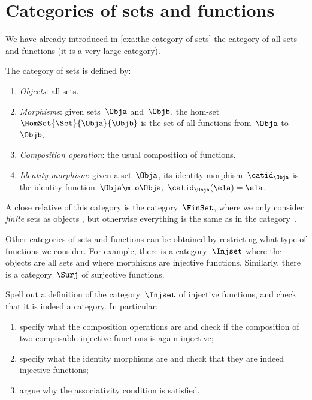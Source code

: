 
\section{Categories of sets and functions}

We have already introduced in \cref{exa:the-category-of-sets} the category of all sets and functions (it is a very large category).

\begin{ctdefinition}
    \label{def:Set}
    The category of sets \iindex{\Set} is defined by:
    \begin{enumerate}
        \item \emph{Objects}: all sets.
        \item \emph{Morphisms}: given sets~$\Obja$ and~$\Objb$, the hom-set~$\HomSet{\Set}{\Obja}{\Objb}$ is the set of all functions from~$\Obja$ to~$\Objb$.
        \item \emph{Composition operation}: the usual composition of functions.
        \item \emph{Identity morphism}: given a set~$\Obja$, its identity morphism~$\catid_\Obja$ is the identity function~$\Obja \mto \Obja, \ \catid_\Obja(\ela) = \ela$.
    \end{enumerate}
\end{ctdefinition}

A close relative of this category is the category~$\FinSet$, where we only consider \emph{finite} sets as objects , but otherwise everything is the same as in the category~\Set.

Other categories of sets and functions can be obtained by restricting what type of functions we consider.
For example, there is a category~$\Injset$ where the objects are all sets and where morphisms are injective functions.
Similarly, there is a category~$\Surj$ of surjective functions.

\begin{exercise}
    Spell out a definition of the category~$\Injset$ of injective functions, and check that it is indeed a category.
    In particular:
    \begin{enumerate}
        \item specify what the composition operations are and check if the composition of two composable injective functions is again injective;
        \item specify what the identity morphisms are and check that they are indeed injective functions;
        \item argue why the associativity condition is satisfied.
    \end{enumerate}
\end{exercise}

